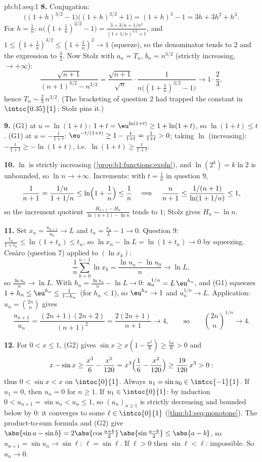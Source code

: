 \begin{solution}{pb:b1:seq:1}
\textbf{8.} Conjugation:
\[
\bigl((1+h)^{3/2} - 1\bigr)\bigl((1+h)^{3/2} + 1\bigr)
= (1+h)^3 - 1 = 3h + 3h^2 + h^3 .
\]
For $h = \frac1n$: $n\bigl((1 + \frac1n)^{3/2} - 1\bigr) =
\frac{3 + 3/n + 1/n^2}{(1 + 1/n)^{3/2} + 1}$, and $1 \leq (1 +
\frac1n)^{3/2} \leq (1 + \frac1n)^2 \to 1$ (squeeze), so the
denominator tends to $2$ and the expression to $\frac32$. Now
Stolz with $a_n = T_n$, $b_n = n^{3/2}$ (strictly increasing,
$\to +\infty$):
\[
\frac{\sqrt{n+1}}{(n+1)^{3/2} - n^{3/2}}
= \frac{\sqrt{n+1}}{\sqrt n} \cdot
\frac{1}{n\bigl((1 + \frac1n)^{3/2} - 1\bigr)}
\longrightarrow 1 \cdot \frac{2}{3},
\]
hence $T_n \sim \frac23\,n^{3/2}$. (The bracketing of question 2
had trapped the constant in $\intcc{0.35}{1}$; Stolz pins it.)

\textbf{9.} (G1) at $u = \ln(1+t)$: $1 + t = \eu^{\ln(1+t)} \geq
1 + \ln(1+t)$, so $\ln(1+t) \leq t$. (G1) at $u =
-\frac{t}{1+t}$: $\eu^{-t/(1+t)} \geq 1 - \frac{t}{1+t} =
\frac{1}{1+t} > 0$; taking $\ln$ (increasing):
$-\frac{t}{1+t} \geq -\ln(1+t)$, i.e.\ $\ln(1+t) \geq
\frac{t}{1+t}$.

\textbf{10.} $\ln$ is strictly increasing
(\cref{prop:b1:functions:expln}), and $\ln(2^k) = k\ln 2$ is
unbounded, so $\ln n \to +\infty$. Increments: with $t =
\frac1n$ in question 9,
\[
\frac 1{n+1} = \frac{1/n}{1 + 1/n} \leq
\ln\Bigl(1 + \frac1n\Bigr) \leq \frac1n
\quad\Longrightarrow\quad
\frac{n}{n+1} \leq \frac{1/(n+1)}{\ln(1 + 1/n)} \leq 1 ,
\]
so the increment quotient $\frac{H_{n+1} - H_n}{\ln(n+1) - \ln
n}$ tends to $1$; Stolz gives $H_n \sim \ln n$.

\textbf{11.} Set $x_n = \frac{u_{n+1}}{u_n} \to L$ and $t_n =
\frac{x_n}{L} - 1 \to 0$. Question 9: $\frac{t_n}{1 + t_n} \leq
\ln(1 + t_n) \leq t_n$, so $\ln x_n - \ln L = \ln(1 + t_n) \to
0$ by squeezing. Ces\`aro (question 7) applied to $(\ln x_k)$:
\[
\frac1n \sum_{k=0}^{n-1} \ln x_k = \frac{\ln u_n - \ln u_0}{n}
\longrightarrow \ln L ,
\]
so $\frac{\ln u_n}{n} \to \ln L$. With $h_n = \frac{\ln u_n}{n}
- \ln L \to 0$: $u_n^{1/n} = L\,\eu^{h_n}$, and (G1) squeezes
$1 + h_n \leq \eu^{h_n} \leq \frac{1}{1 - h_n}$ (for $h_n < 1$),
so $\eu^{h_n} \to 1$ and $u_n^{1/n} \to L$. Application: $u_n =
\binom{2n}{n}$ gives
\[
\frac{u_{n+1}}{u_n} = \frac{(2n+1)(2n+2)}{(n+1)^2}
= \frac{2(2n+1)}{n+1} \longrightarrow 4 ,
\qquad\text{so}\qquad
\binom{2n}{n}^{1/n} \to 4 .
\]

\textbf{12.} For $0 < x \leq 1$, (G2) gives $\sin x \geq x(1 -
\frac{x^2}{6}) \geq \frac{5x}{6} > 0$ and
\[
x - \sin x \geq \frac{x^3}{6} - \frac{x^5}{120}
= x^3\Bigl(\frac16 - \frac{x^2}{120}\Bigr)
\geq \frac{19}{120}\,x^3 > 0 :
\]
thus $0 < \sin x < x$ on $\intoc{0}{1}$. Always $u_1 = \sin u_0
\in \intcc{-1}{1}$. If $u_1 = 0$, then $u_n = 0$ for $n \geq 1$.
If $u_1 \in \intoc{0}{1}$: by induction $0 < u_{n+1} = \sin u_n
< u_n \leq 1$, so $(u_n)_{n\geq1}$ is strictly decreasing and
bounded below by $0$: it converges to some $\ell \in
\intco{0}{1}$ (\cref{thm:b1:seq:monotone}). The product-to-sum
formula and (G2) give $\abs{\sin a - \sin b} = 2\abs{\cos
\frac{a+b}{2}}\,\abs{\sin\frac{a-b}{2}} \leq \abs{a - b}$, so
$u_{n+1} = \sin u_n \to \sin \ell$: $\ell = \sin\ell$. If $\ell
> 0$ then $\sin\ell < \ell$: impossible. So $u_n \to 0$.


\end{solution}
